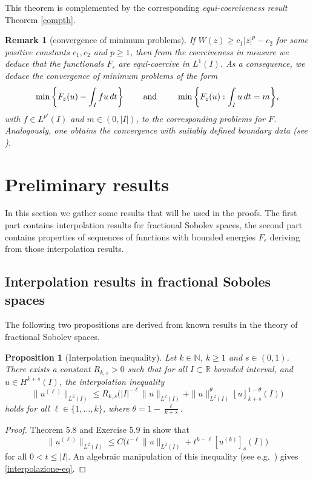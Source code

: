 \documentclass{article}
\newtheorem{proposition}[lemma]{Proposition}
\newtheorem{remark}[lemma]{Remark}
\newcommand{\e}{\varepsilon}
\begin{document}
This theorem is complemented by the corresponding {\em equi-coerciveness result} Theorem \ref{compth}. 

\begin{remark}[convergence of minimum problems]\rm
If $W(z)\ge c_1|z|^p-c_2$ for some positive constants $c_1,c_2$ and $p\ge1$, then from the coerciveness in measure we deduce that the functionals $F_\e$ are equi-coercive in $L^1(I)$. As a consequence, we deduce the convergence of minimum problems of the form
$$
\min
\bigg\{F_\e(u)-\int_Ifu\,dt\bigg\}\qquad \hbox { and }\qquad\min\bigg\{F_\e(u): \int_Iu\,dt=m\bigg\},
$$
with $f\in L^{p'}(I)$ and $m\in(0,|I|)$, to the corresponding problems for $F$.  Analogously, one obtains the convergence with suitably defined boundary data (see \cite{SV}).
\end{remark}


\section{Preliminary results} 
 In this section we gather some results that will be used in the proofs. The first part contains interpolation results for fractional Sobolev spaces, the second part contains properties of sequences of functions with bounded energies $F_\e$  deriving from those interpolation results.


\subsection{Interpolation results in fractional Soboles spaces}

The following two propositions are derived from known results in the theory of fractional Sobolev spaces.

\begin{proposition}[Interpolation inequality]\label{interpolazione} 
Let $k\in \mathbb N$, $k\geq 1$ and $s\in(0,1)$. 
There exists a constant $R_{k,s}>0$ such that for all 
$I\subset \mathbb R$ bounded interval, and $u\in H^{k+s}(I)$, the interpolation inequality 
\begin{equation}\label{interpolazione-eq} 
\|u^{(\ell)}\|_{L^2(I)}\leq R_{k,s}\big(|I|^{-\ell}\|u\|_{L^2(I)}+\|u\|^\theta_{L^2(I)}[u]^{1-\theta}_{k+s}(I) \big) 
\end{equation} 
holds for all $\ell\in \{1,\dots, k\}$, where $\theta=1-\frac{\ell}{k+s}$.  
\end{proposition}

\begin{proof} Theorem 5.8 and Exercise 5.9 in \cite{leofrac} show that 
$$
\|u^{(\ell)}\|_{L^2(I)}\leq C\big(t^{-\ell}\|u\|_{L^2(I)}+t^{k-\ell}[u^{(k)}]_{s}(I) \big)
$$
for all $0<t\le |I|$.
An algebraic manipulation of this inequality (see e.g.~\cite[Exercise 1.26(ii)]{leofrac}) gives \eqref{interpolazione-eq}.
\end{proof}
\end{document}
